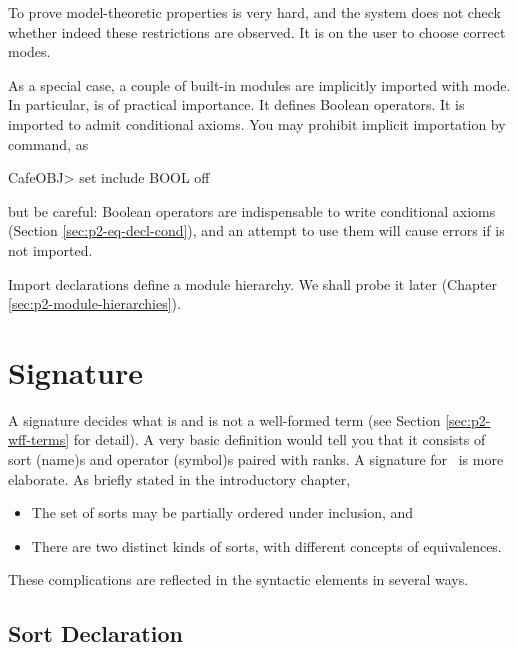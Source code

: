 \documentclass[a4paper]{memoir}
\begin{document}
\begin{warning}
  To prove model-theoretic properties is very hard, and the
  system does not check whether indeed these restrictions are
  observed. It is on the user to choose correct modes.
\end{warning}

As a special case, a couple of built-in modules are implicitly imported
with  mode. In particular, 
is of practical importance. It defines Boolean operators. It
is imported to admit conditional axioms. You may prohibit
implicit importation by  command, as
\begin{vvtm}
\begin{ccode}
  CafeOBJ> set include BOOL off
\end{ccode}
\end{vvtm}
but be careful:
Boolean operators are indispensable to write conditional axioms
(Section \ref{sec:p2-eq-decl-cond}), and an attempt to use them
will cause errors if  is not imported.

Import declarations define a module hierarchy. We shall probe it
later (Chapter \ref{sec:p2-module-hierarchies}).

\chapter{Signature}\label{sec:p2-signature}

A signature
decides what is and is not a well-formed term (see
Section \ref{sec:p2-wff-terms} for detail). A
very basic definition would tell you that it consists of sort
(name)s and operator (symbol)s paired with ranks.
A signature for \cafeobj~is more elaborate. As briefly stated
in the introductory chapter,
\begin{itemize}
\item The set of sorts may be partially ordered under inclusion, and
\item There are two distinct kinds of sorts, with different concepts of
  equivalences.
\end{itemize}
These complications are reflected in the syntactic elements
in several ways.

\section{Sort Declaration}\label{sec:p2-sort-declaration}
\end{document}
